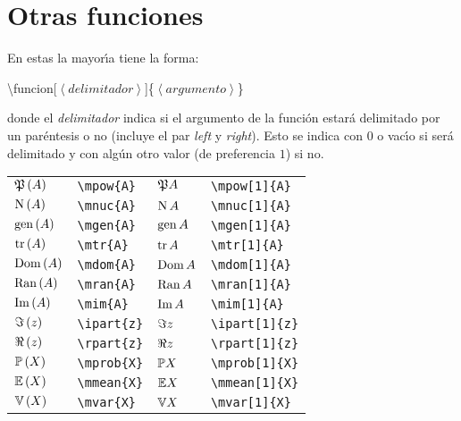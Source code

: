 \documentclass[10pt, a4paper]{article}
\newcommand{\inprod}[1]{\left\langle #1 \right\rangle}
\newcommand{\mpow}[2][0]{
	\ifthenelse{ \equal{#1}{0} }{\mathfrak{P}\left( #2 \right)}{\mathfrak{P}{#2}}
}
\newcommand{\mnuc}[2][0]{
	\ifthenelse{ \equal{#1}{0} }{\operatorname{N}\left( #2 \right)}{\operatorname{N}{#2}}
}
\newcommand{\mgen}[2][0]{
	\ifthenelse{ \equal{#1}{0} }{\operatorname{gen}\left( #2 \right)}{\operatorname{gen}{#2}}
}
\newcommand{\mtr}[2][0]{
	\ifthenelse{ \equal{#1}{0} }{\operatorname{tr}\left( #2 \right)}{\operatorname{tr}{#2}}
}
\newcommand{\mdom}[2][0]{
	\ifthenelse{ \equal{#1}{0} }{\operatorname{Dom}\left( #2 \right)}{\operatorname{Dom}{#2}}
}
\newcommand{\mran}[2][0]{
	\ifthenelse{ \equal{#1}{0} }{\operatorname{Ran}\left( #2 \right)}{\operatorname{Ran}{#2}}
}
\newcommand{\mim}[2][0]{
	\ifthenelse{ \equal{#1}{0} }{\operatorname{Im}\left( #2 \right)}{\operatorname{Im}{#2}}
}
\newcommand{\ipart}[2][0]{
	\ifthenelse{ \equal{#1}{0} }{\Im\left( #2 \right)}{\Im{#2}}
}
\newcommand{\rpart}[2][0]{
	\ifthenelse{ \equal{#1}{0} }{\Re\left( #2 \right)}{\Re{#2}}
}
\newcommand{\mprob}[2][0]{
	\ifthenelse{ \equal{#1}{0} }{\mathbb{P}\left( #2 \right)}{\mathbb{P}{#2}}
}
\newcommand{\mmean}[2][0]{
	\ifthenelse{ \equal{#1}{0} }{\mathbb{E}\left( #2 \right)}{\mathbb{E}{#2}}
}
\newcommand{\mvar}[2][0]{
	\ifthenelse{ \equal{#1}{0} }{\mathbb{V}\left( #2 \right)}{\mathbb{V}{#2}}
}
\begin{document}
\section{Otras funciones}
En estas la mayor\'{\i}a tiene la forma:
\begin{center}
	\ttfamily
	\textbackslash funcion[$ \inprod{delimitador} $]\{$ \inprod{argumento} $\}
\end{center}
donde el \emph{delimitador} indica si el argumento de la función estará delimitado por un paréntesis o no (incluye el par \emph{left} y \emph{right}). Esto se indica con $ 0 $ o vac\'{\i}o si será delimitado y con algún otro valor (de preferencia $ 1 $) si no.
\begin{center}
	\begin{tabular}{ll|ll}
		$ \mpow{A} $ & \texttt{\textbackslash mpow\{A\}} & $ \mpow[1]{A} $ & \texttt{\textbackslash mpow[1]\{A\}}\\
		$ \mnuc{A} $ & \texttt{\textbackslash mnuc\{A\}} & $ \mnuc[1]{A} $ & \texttt{\textbackslash mnuc[1]\{A\}}\\
		$ \mgen{A} $ & \texttt{\textbackslash mgen\{A\}} & $ \mgen[1]{A} $ & \texttt{\textbackslash mgen[1]\{A\}}\\
		$ \mtr{A} $ & \texttt{\textbackslash mtr\{A\}} & $ \mtr[1]{A} $ & \texttt{\textbackslash mtr[1]\{A\}}\\
		$ \mdom{A} $ & \texttt{\textbackslash mdom\{A\}} & $ \mdom[1]{A} $ & \texttt{\textbackslash mdom[1]\{A\}}\\
		$ \mran{A} $ & \texttt{\textbackslash mran\{A\}} & $ \mran[1]{A} $ & \texttt{\textbackslash mran[1]\{A\}}\\
		$ \mim{A} $ & \texttt{\textbackslash mim\{A\}} & $ \mim[1]{A} $ & \texttt{\textbackslash mim[1]\{A\}}\\
		$ \ipart{z} $ & \texttt{\textbackslash ipart\{z\}} & $ \ipart[1]{z} $ & \texttt{\textbackslash ipart[1]\{z\}}\\
		$ \rpart{z} $ & \texttt{\textbackslash rpart\{z\}} & $ \rpart[1]{z} $ & \texttt{\textbackslash rpart[1]\{z\}}\\
		$ \mprob{X} $ & \texttt{\textbackslash mprob\{X\}} & $ \mprob[1]{X} $ & \texttt{\textbackslash mprob[1]\{X\}}\\
		$ \mmean{X} $ & \texttt{\textbackslash mmean\{X\}} & $ \mmean[1]{X} $ & \texttt{\textbackslash mmean[1]\{X\}}\\
		$ \mvar{X} $ & \texttt{\textbackslash mvar\{X\}} & $ \mvar[1]{X} $ & \texttt{\textbackslash mvar[1]\{X\}}\\

\end{tabular}
\end{center}
\end{document}
